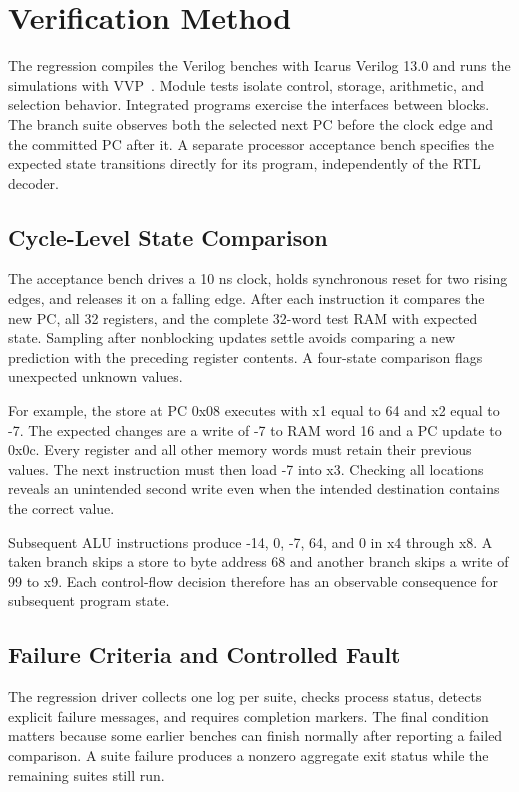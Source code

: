 \documentclass[conference,letterpaper]{IEEEtran}
\begin{document}
\section{Verification Method}

The regression compiles the Verilog benches with Icarus Verilog 13.0 and runs the simulations with VVP~\cite{icarus}. Module tests isolate control, storage, arithmetic, and selection behavior. Integrated programs exercise the interfaces between blocks. The branch suite observes both the selected next PC before the clock edge and the committed PC after it. A separate processor acceptance bench specifies the expected state transitions directly for its program, independently of the RTL decoder.

\subsection{Cycle-Level State Comparison}

The acceptance bench drives a 10 ns clock, holds synchronous reset for two rising edges, and releases it on a falling edge. After each instruction it compares the new PC, all 32 registers, and the complete 32-word test RAM with expected state. Sampling after nonblocking updates settle avoids comparing a new prediction with the preceding register contents. A four-state comparison flags unexpected unknown values.

For example, the store at PC 0x08 executes with x1 equal to 64 and x2 equal to -7. The expected changes are a write of -7 to RAM word 16 and a PC update to 0x0c. Every register and all other memory words must retain their previous values. The next instruction must then load -7 into x3. Checking all locations reveals an unintended second write even when the intended destination contains the correct value.

Subsequent ALU instructions produce -14, 0, -7, 64, and 0 in x4 through x8. A taken branch skips a store to byte address 68 and another branch skips a write of 99 to x9. Each control-flow decision therefore has an observable consequence for subsequent program state.

\subsection{Failure Criteria and Controlled Fault}

The regression driver collects one log per suite, checks process status, detects explicit failure messages, and requires completion markers. The final condition matters because some earlier benches can finish normally after reporting a failed comparison. A suite failure produces a nonzero aggregate exit status while the remaining suites still run.
\end{document}
